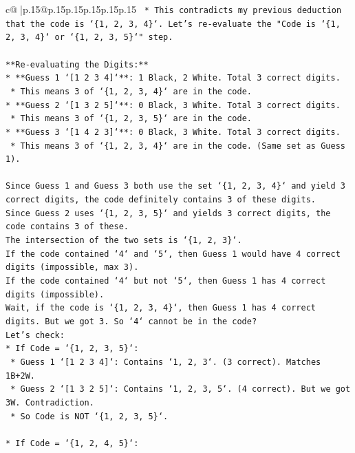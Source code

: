 \documentclass{article}
\begin{document}
{\begin{supertabular}{c@{$\;$}|p{.15\linewidth}@{}p{.15\linewidth}p{.15\linewidth}p{.15\linewidth}p{.15\linewidth}p{.15\linewidth}}
{{{\texttt{        *   This contradicts my previous deduction that the code is `\{1, 2, 3, 4\}`. Let's re{-}evaluate the "Code is `\{1, 2, 3, 4\}` or `\{1, 2, 3, 5\}`" step.} \\
\\ 
\texttt{**Re{-}evaluating the Digits:**} \\
\texttt{*   **Guess 1 `{[}1 2 3 4{]}`**: 1 Black, 2 White. Total 3 correct digits.} \\
\texttt{    *   This means 3 of `\{1, 2, 3, 4\}` are in the code.} \\
\texttt{*   **Guess 2 `{[}1 3 2 5{]}`**: 0 Black, 3 White. Total 3 correct digits.} \\
\texttt{    *   This means 3 of `\{1, 2, 3, 5\}` are in the code.} \\
\texttt{*   **Guess 3 `{[}1 4 2 3{]}`**: 0 Black, 3 White. Total 3 correct digits.} \\
\texttt{    *   This means 3 of `\{1, 2, 3, 4\}` are in the code. (Same set as Guess 1).} \\
\\ 
\texttt{Since Guess 1 and Guess 3 both use the set `\{1, 2, 3, 4\}` and yield 3 correct digits, the code definitely contains 3 of these digits.} \\
\texttt{Since Guess 2 uses `\{1, 2, 3, 5\}` and yields 3 correct digits, the code contains 3 of these.} \\
\texttt{The intersection of the two sets is `\{1, 2, 3\}`.} \\
\texttt{If the code contained `4` and `5`, then Guess 1 would have 4 correct digits (impossible, max 3).} \\
\texttt{If the code contained `4` but not `5`, then Guess 1 has 4 correct digits (impossible).} \\
\texttt{Wait, if the code is `\{1, 2, 3, 4\}`, then Guess 1 has 4 correct digits. But we got 3. So `4` cannot be in the code?} \\
\texttt{Let's check:} \\
\texttt{*   If Code = `\{1, 2, 3, 5\}`:} \\
\texttt{    *   Guess 1 `{[}1 2 3 4{]}`: Contains `1, 2, 3`. (3 correct). Matches 1B+2W.} \\
\texttt{    *   Guess 2 `{[}1 3 2 5{]}`: Contains `1, 2, 3, 5`. (4 correct). But we got 3W. Contradiction.} \\
\texttt{    *   So Code is NOT `\{1, 2, 3, 5\}`.} \\
\\ 
\texttt{*   If Code = `\{1, 2, 4, 5\}`:} \\
}}}
\end{supertabular}}
\end{document}
